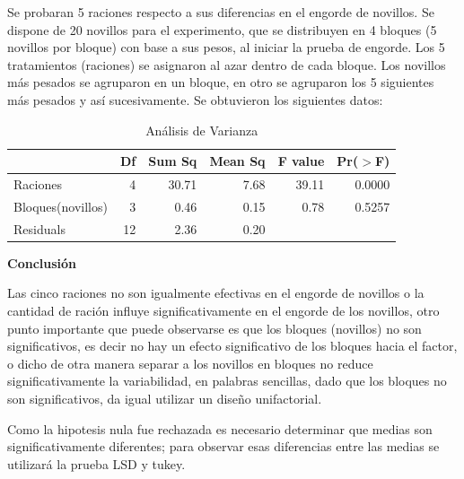 \documentclass[12pt,letterpaper]{report}
\begin{document}
Se probaran 5 raciones respecto a sus diferencias en el engorde de novillos. Se dispone de 20
novillos para el experimento, que se distribuyen en 4 bloques (5 novillos por bloque) con base
a sus pesos, al iniciar la prueba de engorde. Los 5 tratamientos (raciones) se asignaron al azar
dentro de cada bloque. Los novillos más pesados se agruparon en un bloque, en otro se
agruparon los 5 siguientes más pesados y así sucesivamente. Se obtuvieron los siguientes
datos:



\begin{Schunk}
\end{Schunk}

\begin{table}[ht]
\centering
\begin{tabular}{lrrrrr}
  \hline
 & Df & Sum Sq & Mean Sq & F value & Pr($>$F) \\ 
  \hline
Raciones & 4 & 30.71 & 7.68 & 39.11 & 0.0000 \\ 
Bloques(novillos) & 3 & 0.46 & 0.15 & 0.78 & 0.5257 \\ 
  Residuals & 12 & 2.36 & 0.20 &  &  \\ 
   \hline
\end{tabular}
\caption{Análisis de Varianza}
\end{table}

\textbf{Conclusión}

Las cinco raciones no son igualmente efectivas en el engorde de novillos o la cantidad de
ración influye significativamente en el engorde de los novillos, otro punto importante que puede observarse es que los bloques (novillos) no son significativos, es decir no hay un efecto significativo de los bloques hacia el factor, o dicho de otra manera separar a los novillos en bloques no reduce significativamente la variabilidad, en palabras sencillas, dado que los bloques no son significativos, da igual utilizar un diseño unifactorial.

Como la hipotesis nula fue rechazada es necesario determinar
que medias son significativamente diferentes; para observar esas diferencias entre las medias
se utilizará la prueba LSD y tukey.
\end{document}
